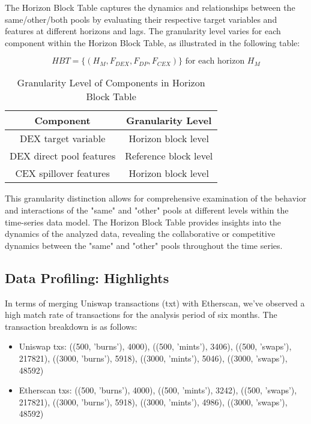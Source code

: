 \documentclass{article}
\begin{document}
{The Horizon Block Table captures the dynamics and relationships between the same/other/both pools by evaluating their respective target variables and features at different horizons and lags. The granularity level varies for each component within the Horizon Block Table, as illustrated in the following table:

\begin{equation}
  HBT = \{ (H_{M}, F_{DEX}, F_{DP}, F_{CEX}) \} \text{ for each horizon } H_{M} 
  \end{equation}
  

\begin{table}[htbp]
  \centering
  \begin{tabular}{|c|c|}
  \hline
  \textbf{Component} & \textbf{Granularity Level} \\
  \hline
  DEX target variable & Horizon block level \\
  \hline
  DEX direct pool features & Reference block level \\
  \hline
  CEX spillover features & Horizon block level \\
  \hline
  \end{tabular}
  \caption{Granularity Level of Components in Horizon Block Table}
  \label{table:granularity}
\end{table}

This granularity distinction allows for comprehensive examination of the behavior and interactions of the "same" and "other" pools at different levels within the time-series data model. The Horizon Block Table provides insights into the dynamics of the analyzed data, revealing the collaborative or competitive dynamics between the "same" and "other" pools throughout the time series.

\subsection*{Data Profiling: Highlights}

In terms of merging Uniswap transactions (txt) with Etherscan, we've observed a high match rate of transactions for the analysis period of six months. The transaction breakdown is as follows:

\begin{itemize}[leftmargin=*,noitemsep,nolistsep]
\small
\item Uniswap txs: ((500, 'burns'), 4000), ((500, 'mints'), 3406), ((500, 'swaps'), 217821), ((3000, 'burns'), 5918), ((3000, 'mints'), 5046), ((3000, 'swaps'), 48592)
\item Etherscan txs: ((500, 'burns'), 4000), ((500, 'mints'), 3242), ((500, 'swaps'), 217821), ((3000, 'burns'), 5918), ((3000, 'mints'), 4986), ((3000, 'swaps'), 48592)
\end{itemize}

}
\end{document}

